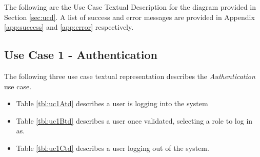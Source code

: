\documentclass[fontsize=12pt,paper=letter,twoside]{scrartcl}
\begin{document}
The following are the Use Case Textual Description for the diagram provided in Section \ref{sec:ucd}. A list of success and error messages are provided in Appendix \ref{app:success} and \ref{app:error} respectively.
\newpage
\subsection{Use Case 1 - Authentication} \label{subsec:uc1}

The following three use case textual representation describes the \emph{Authentication} use case.


\begin{itemize}
\item Table \ref{tbl:uc1Atd} describes a user is logging into the system
\item Table \ref{tbl:uc1Btd} describes a user once validated, selecting a role to log in as.
\item Table \ref{tbl:uc1Ctd} describes a user logging out of the system.
\end{itemize}
\end{document}
